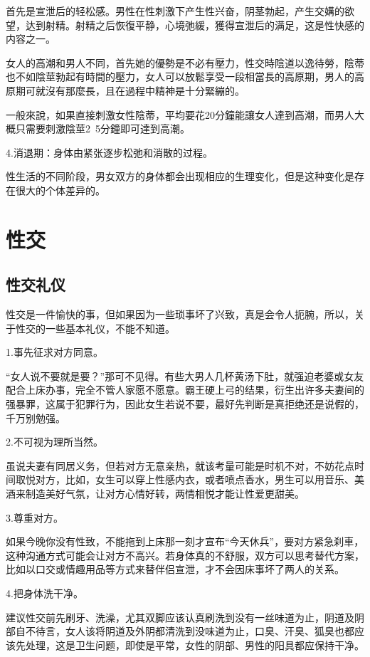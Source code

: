 \documentclass[12pt,UTF8]{ctexbook}
\begin{document}
首先是宣泄后的轻松感。男性在性刺激下产生性兴奋，阴茎勃起，产生交媾的欲望，达到射精。射精之后恢復平静，心境弛緩，獲得宣泄后的满足，这是性快感的内容之一。

女人的高潮和男人不同，首先她的優勢是不必有壓力，性交時陰道以逸待勞，陰蒂也不如陰莖勃起有時間的壓力，女人可以放鬆享受一段相當長的高原期，男人的高原期可就沒有那麼長，且在過程中精神是十分緊繃的。

一般來說，如果直接刺激女性陰蒂，平均要花20分鐘能讓女人達到高潮，而男人大概只需要刺激陰莖2~5分鐘即可達到高潮。

4.消退期：身体由紧张逐步松弛和消散的过程。

性生活的不同阶段，男女双方的身体都会出现相应的生理变化，但是这种变化是存在很大的个体差异的。

\part{性交}

\chapter{性交礼仪}

性交是一件愉快的事，但如果因为一些琐事坏了兴致，真是会令人扼腕，所以，关于性交的一些基本礼仪，不能不知道。

1.事先征求对方同意。

“女人说不要就是要？”那可不见得。有些大男人几杯黄汤下肚，就强迫老婆或女友配合上床办事，完全不管人家愿不愿意。霸王硬上弓的结果，衍生出许多夫妻间的强暴罪，这属于犯罪行为，因此女生若说不要，最好先判断是真拒绝还是说假的，千万别勉强。

2.不可视为理所当然。

虽说夫妻有同居义务，但若对方无意亲热，就该考量可能是时机不对，不妨花点时间取悦对方，比如，女生可以穿上性感内衣，或者喷点香水，男生可以用音乐、美酒来制造美好气氛，让对方心情好转，两情相悦才能让性爱更甜美。

3.尊重对方。

如果今晚你没有性致，不能拖到上床那一刻才宣布“今天休兵”，要对方紧急刹車，这种沟通方式可能会让对方不高兴。若身体真的不舒服，双方可以思考替代方案，比如以口交或情趣用品等方式来替伴侣宣泄，才不会因床事坏了两人的关系。

4.把身体洗干净。

建议性交前先刷牙、洗澡，尤其双脚应该认真刷洗到没有一丝味道为止，阴道及阴部自不待言，女人该将阴道及外阴都清洗到没味道为止，口臭、汗臭、狐臭也都应该先处理，这是卫生问题，即使是平常，女性的阴部、男性的阳具都应保持干净。
\end{document}

